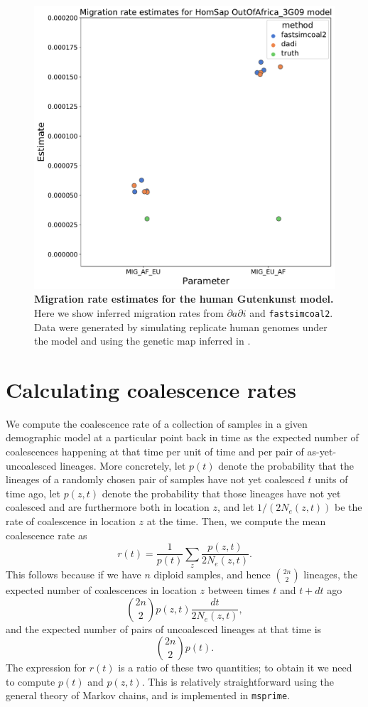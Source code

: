 \documentclass[12pt,halfline,a4paper]{ouparticle}
\newcommand{\stopsupplement}{%
        \setcounter{table}{0}
        \renewcommand{\thetable}{\arabic{table}}%
        \setcounter{figure}{0}
        \renewcommand{\thefigure}{\arabic{figure}}%
     }
\newcommand{\dadi}{$\partial a \partial i$\xspace}
\newcommand{\fastsimcoal}{\texttt{fastsimcoal2}\xspace}
\begin{document}
\begin{figure}
\begin{center}
\includegraphics[width=0.8\linewidth]{display_items/homsap_migration_rates.pdf}
\caption{\textbf{Migration rate estimates for the human Gutenkunst model.}
Here we show inferred migration rates from \dadi and \fastsimcoal.
Data were generated by simulating
replicate human genomes under the \cite{gutenkunst2009inferring} model and using the genetic map
inferred in \cite{international2007second}.}
\label{fig:homsap_mig_rates}
\end{center}
\end{figure}


\stopsupplement

\appendix

\section*{Calculating coalescence rates}

We compute the coalescence rate of a collection of samples in a given demographic model
at a particular point back in time
as the expected number of coalescences happening at that time
per unit of time and per pair of as-yet-uncoalesced lineages.
More concretely,
let $p(t)$ denote the probability that the lineages of a randomly chosen pair of samples
have not yet coalesced $t$ units of time ago,
let $p(z, t)$ denote the probability that those lineages have not yet coalesced
and are furthermore both in location $z$,
and let $1/(2 N_e(z,t))$ be the rate of coalescence in location $z$ at the time.
Then, we compute the mean coalescence rate as
$$  r(t)  = \frac{1}{p(t)} \sum_z \frac{p(z,t)}{2N_e(z,t)} . $$
This follows because if we have $n$ diploid samples, and hence $\binom{2n}{2}$ lineages,
the expected number of coalescences in location $z$ between times $t$ and $t+dt$ ago
$$
\binom{2n}{2} p(z,t) \frac{ dt }{ 2 N_e(z,t) }, 
$$
and the expected number of pairs of uncoalesced lineages at that time is
$$
\binom{2n}{2} p(t) .
$$
The expression for $r(t)$ is a ratio of these two quantities;
to obtain it we need to compute $p(t)$ and $p(z,t)$.
This is relatively straightforward
using the general theory of Markov chains, and is implemented in \texttt{msprime}.
\end{document}
